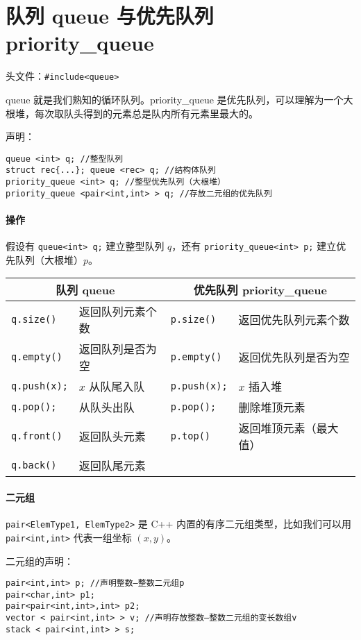 \documentclass[UTF8]{ctexart}
\begin{document}
\section{队列 queue 与优先队列 priority\_queue}
头文件：\verb!#include<queue>!

queue 就是我们熟知的循环队列。priority\_queue 是优先队列，可以理解为一个大根堆，每次取队头得到的元素总是队内所有元素里最大的。

声明：
\begin{lstlisting}[numbers=none]
queue <int> q; //整型队列
struct rec{...}; queue <rec> q; //结构体队列
priority_queue <int> q; //整型优先队列（大根堆）
priority_queue <pair<int,int> > q; //存放二元组的优先队列
\end{lstlisting}

\paragraph{操作} 假设有 \verb!queue<int> q;! 建立整型队列 $q$，还有 \verb!priority_queue<int> p;! 建立优先队列（大根堆）$p$。
\begin{table}[H]
  \centering
  \begin{tabular}{llll}
  \toprule
  \multicolumn{2}{c}{队列 queue} & \multicolumn{2}{c}{优先队列 priority\_queue} \\
  \midrule
  \verb!q.size()! & 返回队列元素个数 & \verb!p.size()! & 返回优先队列元素个数 \\
  \verb!q.empty()! & 返回队列是否为空 & \verb!p.empty()! & 返回优先队列是否为空 \\
  \verb!q.push(x);! & $x$ 从队尾入队 & \verb!p.push(x);! & $x$ 插入堆 \\
  \verb!q.pop();! & 从队头出队 & \verb!p.pop();! & 删除堆顶元素 \\
  \verb!q.front()! & 返回队头元素 & \verb!p.top()! & 返回堆顶元素（最大值） \\
  \verb!q.back()! & 返回队尾元素 & & \\
  \bottomrule
  \end{tabular}
\end{table}

\paragraph{二元组}
\verb!pair<ElemType1, ElemType2>! 是 C++ 内置的有序二元组类型，比如我们可以用 \verb!pair<int,int>! 代表一组坐标 $(x,y)$。\textcolor{cyan}{}

二元组的声明：
\begin{lstlisting}[numbers=none]
pair<int,int> p; //声明整数—整数二元组p
pair<char,int> p1;
pair<pair<int,int>,int> p2;
vector < pair<int,int> > v; //声明存放整数—整数二元组的变长数组v
stack < pair<int,int> > s;
\end{lstlisting}
\end{document}
